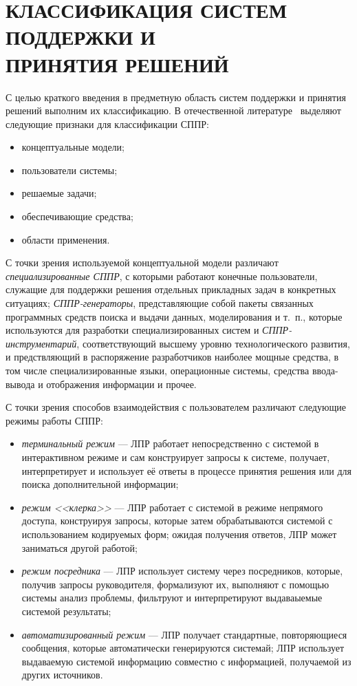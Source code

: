 \section[Классификация систем поддержки и принятия решений]{%
  КЛАССИФИКАЦИЯ СИСТЕМ ПОДДЕРЖКИ И \\ ПРИНЯТИЯ РЕШЕНИЙ
}

С целью краткого введения в предметную область систем поддержки
и принятия решений выполним их классификацию.
В отечественной литературе~\cite{larichev1987} выделяют следующие признаки
для классификации СППР:
\begin{itemize}
\item концептуальные модели;
\item пользователи системы;
\item решаемые задачи;
\item обеспечивающие средства;
\item области применения.
\end{itemize}

С точки зрения используемой концептуальной модели различают
\emph{специализированные СППР}, с которыми работают конечные пользователи,
служащие для поддержки решения отдельных прикладных задач в конкретных ситуациях;
\emph{СППР-генераторы}, представляющие собой пакеты связанных программных средств
поиска и выдачи данных, моделирования и т.~п., которые используются для разработки
специализированных систем и
\emph{СППР-инструментарий}, соответствующий высшему уровню технологического развития,
и предствляющий в распоряжение разработчиков наиболее мощные средства, в том числе
специализированные языки, операционные системы, средства ввода-вывода и отображения
информации и прочее.

С точки зрения способов взаимодействия с пользователем различают следующие
режимы работы СППР:
\begin{itemize}
\item \emph{терминальный режим} --- ЛПР работает непосредственно с
  системой в интерактивном режиме и сам конструирует запросы к системе,
  получает, интерпретирует и использует её ответы в процессе принятия
  решения или для поиска дополнительной информации;
\item \emph{режим <<клерка>>} --- ЛПР работает с системой в режиме непрямого доступа,
  конструируя запросы, которые затем обрабатываются системой с использованием
  кодируемых форм; ожидая получения ответов, ЛПР может заниматься другой работой;
\item \emph{режим посредника} --- ЛПР использует систему через посредников,
  которые, получив запросы руководителя, формализуют их, выполняют с помощью
  системы анализ проблемы, фильтруют и интерпретируют выдаваыемые системой результаты;
\item \emph{автоматизированный режим} --- ЛПР получает стандартные, повторяющиеся сообщения,
  которые автоматически генерируются системай; ЛПР использует выдаваемую системой
  информацию совместно с информацией, получаемой из других источников.
\end{itemize}

